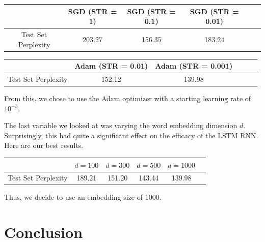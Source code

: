\documentclass[11pt]{article}
\begin{document}
\begin{center}
	\begin{tabular}{ c | c c c c c}
		 & SGD (STR = 1) & SGD (STR = 0.1) & SGD (STR = 0.01)  \\
		\hline
		Test Set Perplexity & 203.27 & 156.35 & 183.24 
	\end{tabular}
\end{center} 

\begin{center}
	\begin{tabular}{ c | c c c c c}
		 & Adam (STR = 0.01) & Adam (STR = 0.001)  \\
		\hline
		Test Set Perplexity & 152.12 & 139.98 
	\end{tabular}
\end{center} 
From this, we chose to use the Adam optimizer with a starting learning rate of $10^{-3}$.  

The last variable we looked at was varying the word embedding dimension $d$.  Surprisingly, this had quite a significant effect on the efficacy of the LSTM RNN.  Here are our best results. 

\begin{center}
	\begin{tabular}{ c | c c c c c}
		 & $d = 100$ & $d = 300$ & $d = 500$ &  $d = 1000$  \\
		\hline
		Test Set Perplexity & 189.21 & 151.20 & 143.44  & 139.98 
	\end{tabular}
\end{center}    

Thus, we decide to use an embedding size of 1000.

\section{Conclusion}




\nocite{*}

\end{document}
